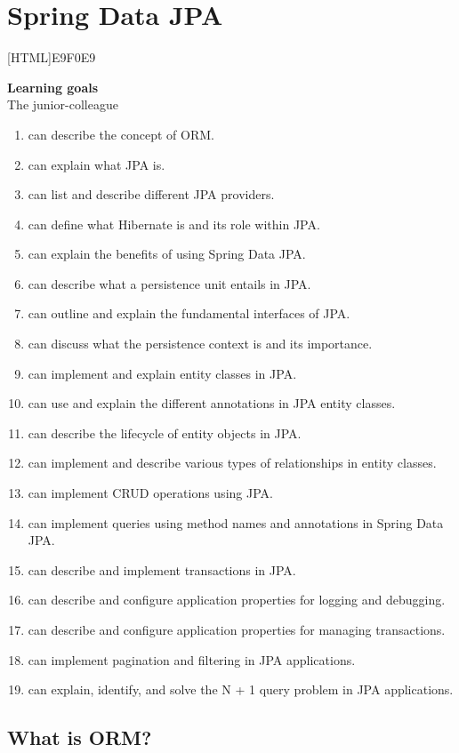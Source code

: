 \chapter{Spring Data JPA}

[HTML]{E9F0E9}{\parbox{\textwidth}{%
\noindent \textbf{Learning goals}\\
The junior-colleague
\begin{enumerate}[nolistsep]
\item can describe the concept of ORM.
\item can explain what JPA is.
\item can list and describe different JPA providers.
\item can define what Hibernate is and its role within JPA.
\item can explain the benefits of using Spring Data JPA.
\item can describe what a persistence unit entails in JPA.
\item can outline and explain the fundamental interfaces of JPA.
\item can discuss what the persistence context is and its importance.
\item can implement and explain entity classes in JPA.
\item can use and explain the different annotations in JPA entity classes.
\item can describe the lifecycle of entity objects in JPA.
\item can implement and describe various types of relationships in entity classes.
\item can implement CRUD operations using JPA.
\item can implement queries using method names and annotations in Spring Data JPA.
\item can describe and implement transactions in JPA.
\item can describe and configure application properties for logging and debugging.
\item can describe and configure application properties for managing transactions.
\item can implement pagination and filtering in JPA applications.
\item can explain, identify, and solve the N + 1 query problem in JPA applications.
\end{enumerate}}}

  
\section{What is ORM?}

